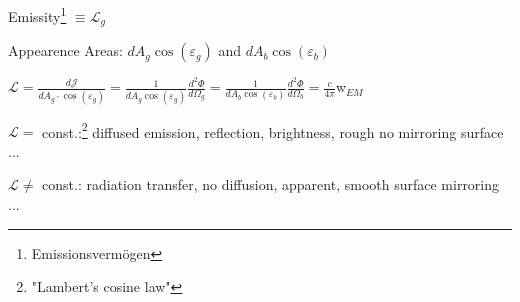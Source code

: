 \vspace{1ex} 
Emissity\footnote{Emissionsvermögen} $\equiv \mathscr{L}_g$ 

Appearence Areas:  $dA_g \cos(\varepsilon_g)$ and $dA_b \cos(\varepsilon_b)$ 
\vspace{1ex} 

$
\mathscr{L} = 
\frac{d\mathscr{J}}{dA_g \cdot \cos(\varepsilon_g)} = 
\frac{1}{dA_g \cos(\varepsilon_g)} \frac{d^2\Phi}{d\Omega_g} = 
\frac{1}{dA_b \cos(\varepsilon_b)} \frac{d^2\Phi}{d\Omega_b} = 
\frac{c}{4\pi} $w$_{EM} 
$

\vspace{2ex} 
$\mathscr{L} = $ const.:\footnote{"Lambert's cosine law"} diffused emission, reflection, brightness, rough no mirroring surface
...

$\mathscr{L} \neq$ const.: radiation transfer, no diffusion, apparent, smooth surface mirroring
...

